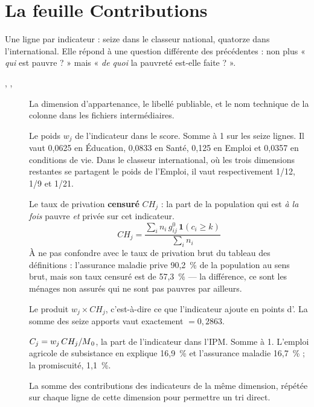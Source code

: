\documentclass[11pt,a4paper]{article}
\begin{document}
\section{La feuille \textsf{Contributions}}

Une ligne par indicateur : seize dans le classeur national, quatorze dans l'international. Elle répond à une question différente des précédentes :
non plus « \emph{qui} est pauvre ? » mais « \emph{de quoi} la pauvreté est-elle faite ? ».

\begin{description}
  \item[, , ] La dimension d'appartenance, le libellé
  publiable, et le nom technique de la colonne dans les fichiers intermédiaires.

  \item[] Le poids $w_j$ de l'indicateur dans le score. Somme à 1 sur les seize
  lignes. Il vaut 0,0625 en Éducation, 0,0833 en Santé, 0,125 en Emploi et 0,0357 en
  conditions de vie. Dans le classeur international, où les trois dimensions restantes se
  partagent le poids de l'Emploi, il vaut respectivement 1/12, 1/9 et 1/21.

  \item[] Le taux de privation \textbf{censuré} $CH_j$ : la part de
  la population qui est \emph{à la fois} pauvre \emph{et} privée sur cet indicateur.
  \[
  CH_j = \frac{\sum_i n_i \, g^0_{ij} \, \mathbf{1}(c_i \ge k)}{\sum_i n_i}
  \]
  À ne pas confondre avec le taux de privation brut du tableau des définitions : l'assurance
  maladie prive 90,2~\% de la population au sens brut, mais son taux censuré est de 57,3~\% ---
  la différence, ce sont les ménages non assurés qui ne sont pas pauvres par ailleurs.

  \item[] Le produit $w_j \times CH_j$, c'est-à-dire ce que l'indicateur ajoute
  en points d'\ipm{}. La somme des seize apports vaut exactement \ipm{} $= 0{,}2863$.

  \item[] $C_j = w_j \, CH_j / M\textsubscript{0}$, la part de l'indicateur dans l'IPM.
  Somme à 1. L'emploi agricole de subsistance en explique 16,9~\% et l'assurance maladie 16,7~\% ;
  la promiscuité, 1,1~\%.

  \item[] La somme des contributions des indicateurs de la même
  dimension, répétée sur chaque ligne de cette dimension pour permettre un tri direct.
\end{description}
\end{document}
